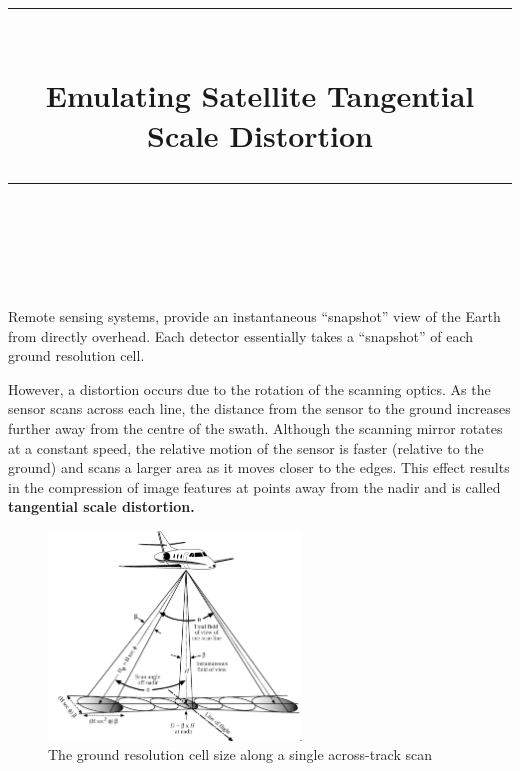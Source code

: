 \documentclass[11pt]{scrartcl}
\begin{document}
 
 
\newcommand{\horrule}[1]{\rule{\linewidth}{#1}} 	%

\title{
		\vspace{-0.5in} 	
		\horrule{0.5pt} \\[0.4cm]
		\Large Emulating Satellite Tangential Scale Distortion \\
		\horrule{2pt} \\
}
\date{}
 

\maketitle

 


Remote sensing systems, provide an instantaneous \enquote{snapshot} view of the Earth from directly overhead. Each detector essentially takes a \enquote{snapshot} of each ground resolution cell.

However, a distortion occurs due to the rotation of the scanning optics. As the sensor scans across each line, the distance from the sensor to the ground increases further away from the centre of the swath. Although the scanning mirror rotates at a constant speed, the relative motion of the sensor is faster (relative to the ground) and scans a larger area as it moves closer to the edges. This effect results in the compression of image features at points away from the nadir and is called \textbf{tangential scale distortion.}


\begin{figure}[h]\label{img:plane}
\centering
\includegraphics[width=0.6\textwidth]{img/plane_view.png}
\caption{The ground resolution cell size along a single across-track scan}
\end{figure}
\end{document}
